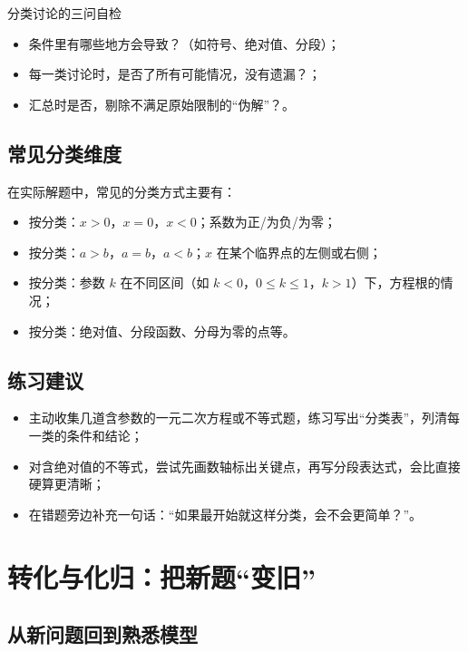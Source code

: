 \documentclass[a4paper,11pt]{ctexart}
\begin{document}
\begin{summarybox}{分类讨论的三问自检}
\begin{itemize}
  \item 条件里有哪些地方会导致？（如符号、绝对值、分段）；
  \item 每一类讨论时，是否了所有可能情况，没有遗漏？；
  \item 汇总时是否，剔除不满足原始限制的“伪解”？。
\end{itemize}
\end{summarybox}

\subsection{常见分类维度}

在实际解题中，常见的分类方式主要有：
\begin{itemize}
  \item 按分类：$x>0$，$x=0$，$x<0$；系数为正/为负/为零；
  \item 按分类：$a>b$，$a=b$，$a<b$；$x$ 在某个临界点的左侧或右侧；
  \item 按分类：参数 $k$ 在不同区间（如 $k<0$，$0\le k\le 1$，$k>1$）下，方程根的情况；
  \item 按分类：绝对值、分段函数、分母为零的点等。
\end{itemize}

\subsection{练习建议}

\begin{itemize}
  \item 主动收集几道含参数的一元二次方程或不等式题，练习写出“分类表”，列清每一类的条件和结论；
  \item 对含绝对值的不等式，尝试先画数轴标出关键点，再写分段表达式，会比直接硬算更清晰；
  \item 在错题旁边补充一句话：“如果最开始就这样分类，会不会更简单？”。
\end{itemize}

\section{转化与化归：把新题“变旧”}

\subsection{从新问题回到熟悉模型}
\end{document}
